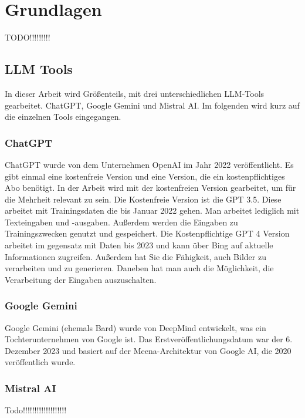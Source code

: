 
\chapter{Grundlagen} 

TODO!!!!!!!!!

\section{LLM Tools}  \label{LLM Tools}

In dieser Arbeit wird Größenteils, mit drei unterschiedlichen LLM-Tools gearbeitet. ChatGPT,  
Google Gemini und Mistral AI. Im folgenden wird kurz auf die einzelnen Tools eingegangen. 

\subsection{ChatGPT}  \label{ChatGPT}

ChatGPT wurde von dem Unternehmen OpenAI im Jahr 2022 veröffentlicht. Es gibt einmal eine kostenfreie Version und eine  
Version, die ein kostenpflichtiges Abo benötigt. In der Arbeit wird mit der kostenfreien Version gearbeitet,  
um für die Mehrheit relevant zu sein. Die Kostenfreie Version ist die GPT 3.5. Diese arbeitet mit Trainingsdaten  
die bis Januar 2022 gehen. Man arbeitet lediglich mit Texteingaben und -ausgaben. Außerdem werden die Eingaben zu  
Trainingszwecken genutzt und gespeichert. Die Kostenpflichtige GPT 4 Version arbeitet im gegensatz mit Daten bis 2023  
und kann über Bing auf aktuelle Informationen zugreifen. Außerdem hat Sie die Fähigkeit, auch Bilder zu verarbeiten  
und zu generieren. Daneben hat man auch die Möglichkeit, die Verarbeitung der Eingaben auszuschalten. 

\subsection{Google Gemini}  \label{Google Gemini}

Google Gemini (ehemals Bard) wurde von DeepMind entwickelt, was ein Tochterunternehmen von Google ist. Das  
Erstveröffentlichungsdatum war der 6. Dezember 2023 und basiert auf der Meena-Architektur von Google AI, die  
2020 veröffentlich wurde.

\subsection{Mistral AI}  \label{Mistral AI}

Todo!!!!!!!!!!!!!!!!!!!